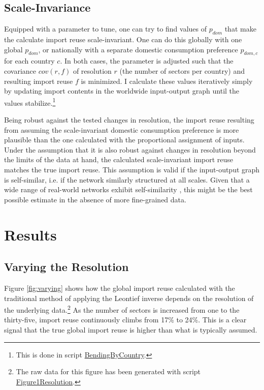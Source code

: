 \documentclass{paper}
\begin{document}
\subsection{Scale-Invariance}
\label{met:scale-invariance}
Equipped with a parameter to tune, one can try to find values of $p_{dom}$ that make the calculate import reuse scale-invariant. One can do this globally with one global $p_{dom}$, or nationally with a separate domestic consumption preference $p_{dom,c}$ for each country $c$. In both cases, the parameter is adjusted such that the covariance $cov(r, f)$ of resolution $r$ (the number of sectors per country) and resulting import reuse $f$ is minimized. I calculate these values iteratively simply by updating import contents in the worldwide input-output graph until the values stabilize.\footnote{This is done in script \href{https://github.com/kronrod/importreuse/blob/master/src/com/meissereconomics/seminar/run/BendingByCountry.java}{BendingByCountry}.}

Being robust against the tested changes in resolution, the import reuse resulting from assuming the scale-invariant domestic consumption preference is more plausible than the one calculated with the proportional assignment of inputs. Under the assumption that it is also robust against changes in resolution beyond the limits of the data at hand, the calculated scale-invariant import reuse matches the true import reuse. This assumption is valid if the input-output graph is self-similar, i.e. if the network similarly structured at all scales. Given that a wide range of real-world networks exhibit self-similarity \cite{song2005self}, this might be the best possible estimate in the absence of more fine-grained data.

\section{Results}

\subsection{Varying the Resolution}
\label{res:varying}

Figure \ref{fig:varying} shows how the global import reuse calculated with the traditional method of applying the Leontief inverse depends on the resolution of the underlying data.\footnote{The raw data for this figure has been generated with script \href{https://github.com/kronrod/importreuse/blob/master/src/com/meissereconomics/seminar/run/Figure1Resolution.java}{Figure1Resolution}.} As the number of sectors is increased from one to the thirty-five, import reuse continuously climbs from 17\% to 24\%. This is a clear signal that the true global import reuse is higher than what is typically assumed.
\end{document}
